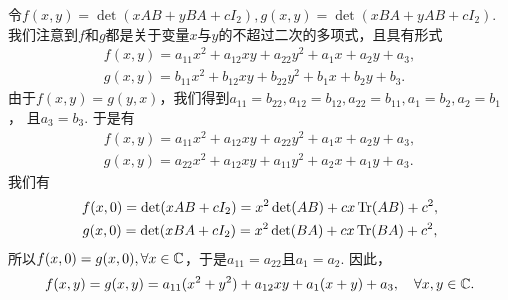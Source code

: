 \begin{solution}
  令$f(x,y)=\det(xAB+yBA+cI_2),g(x,y)=\det(xBA+yAB+cI_2)$. 我们注意到$f$和$g$都是关于变量$x$与$y$的不超过二次的多项式，且具有形式
  \begin{gather*}
    f(x,y) = a_{11}x^2 + a_{12}xy + a_{22}y^2 + a_1x + a_2y + a_3 , \\
    g(x,y) = b_{11}x^2 + b_{12}xy + b_{22}y^2 + b_1x + b_2y + b_3 .
  \end{gather*}
  由于$f(x,y)=g(y,x)$，我们得到$a_{11}=b_{22},a_{12}=b_{12},a_{22}=b_{11},a_1=b_2,a_2=b_1$，
  且$a_3=b_3$. 于是有
  \begin{gather*}
    f(x,y) = a_{11}x^2 + a_{12}xy + a_{22}y^2 + a_1x + a_2y + a_3 , \\
    g(x,y) = a_{22}x^2 + a_{12}xy + a_{11}y^2 + a_2x + a_1y + a_3 .
  \end{gather*}
  我们有
  \begin{gather*}
    f(x,0) = \det (xAB + cI_2) = x^2\det(AB) + cx\operatorname{Tr}(AB) + c^2, \\
    g(x,0) = \det (xBA + cI_2) = x^2\det(BA) + cx\operatorname{Tr}(BA) + c^2,
  \end{gather*}
  所以$f(x,0)=g(x,0),\forall x\in\mathbb C$，于是$a_{11}=a_{22}$且$a_1=a_2$. 因此，
  \[
    f(x,y) = g(x,y) = a_{11}(x^2+y^2) + a_{12}xy + a_1(x+y) + a_3,\quad \forall x,y\in\mathbb C.
  \]
\end{solution}

